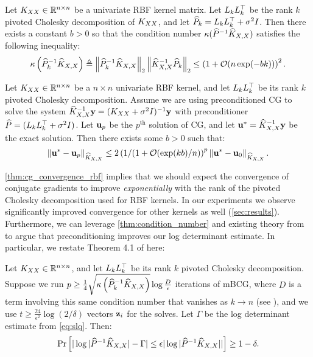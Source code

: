 \begin{lemma}
  \label{thm:condition_number}
  Let $K_{XX} \in \mathbb{R}^{n \times n}$ be a univariate RBF kernel matrix.
  Let $L_{k} L_k^\top$ be the rank $k$ pivoted Cholesky decomposition of $K_{XX}$, and let $\widehat{P}_{k} = L_k L_k^\top + \sigma^{2}I$.
  Then there exists a constant $b>0$ so that the condition number $\kappa(\widehat{P}^{-1}\widehat{K}_{X,X})$ satisfies the following inequality:
  \begin{equation}
    \kappa \left( \trainP_{k}^{-1}\trainK \right)
    \triangleq \left\Vert \trainP_{k}^{-1}\trainK \right\Vert_{2} \left\Vert \trainK^{-1}\trainP_{k} \right\Vert_{2}
    \leq \left( 1 + \bigo{n\exp(-bk)} \right)^2.
  \end{equation}
\end{lemma}
\begin{theorem}
  \label{thm:cg_convergence_rbf}
  Let $K_{XX} \in \mathbb{R}^{n \times n}$ be a $n \times n$ univariate RBF kernel, and let $L_k L_k^\top$ be its rank $k$ pivoted Cholesky decomposition.
  Assume we are using preconditioned CG to solve the system $\widehat{K}_{X,X}^{-1} \mathbf{y} = (K_{XX} + \sigma^2 I)^{-1} \mathbf{y}$ with preconditioner $\widehat{P} = (L_k L_k^\top + \sigma^2 I)$.
  Let $\mathbf{u}_p$ be the $p^\textrm{th}$ solution of CG, and let $\mathbf{u}^{*} = \widehat{K}_{X,X}^{-1} \mathbf{y}$ be the exact solution.
  Then there exists some $b > 0$ such that:
  \begin{equation}
    \Vert \bu^{*} - \bu_{p} \Vert_{\trainK}
    \leq 2 \left(1/(1 + \bigo{\exp(kb)/n}\right)^{p} \left\Vert \bu^{*} - \bu_{0} \right\Vert_{\trainK}.
  \end{equation}
\end{theorem}
%
\autoref{thm:cg_convergence_rbf} implies that we should expect the convergence of conjugate gradients to improve \emph{exponentially} with the rank of the pivoted Cholesky decomposition used for RBF kernels. In our experiments we observe significantly improved convergence for other kernels as well (\autoref{sec:results}). Furthermore, we can leverage \autoref{thm:condition_number} and existing theory from \cite{ubaru2017fast} to argue that preconditioning improves our log determinant estimate. In particular, we restate Theorem 4.1 of \citet{ubaru2017fast} here:
\begin{theorem}
  \label{thm:slq_convergence}
  Let $K_{XX} \in \mathbb{R}^{n \times n}$, and let $L_k L_k^\top$ be its rank $k$ pivoted Cholesky decomposition. Suppose we run $p \geq \frac{1}{4} \sqrt{ \kappa \left( \widehat{P}_{k}^{-1}\widehat{K}_{X,X} \right) } \log \frac{D}{\epsilon}$ iterations of mBCG, where $D$ is a term involving this same condition number that vanishes as $k \to n$ (see \cite{ubaru2017fast}), and we use $t \geq \frac{24}{\epsilon^{2}}\log(2/\delta)$ vectors $\mathbf{z}_{i}$ for the solves. Let $\Gamma$ be the log determinant estimate from \eqref{eq:slq}. Then:
  \begin{equation}
    \textrm{Pr}\left[\vert \log \vert \widehat{P}^{-1}\widehat{K}_{X,X} \vert - \Gamma \vert \leq \epsilon\vert \log \vert \widehat{P}^{-1}\widehat{K}_{X,X} \vert \vert \right] \geq 1 - \delta.
  \end{equation}
\end{theorem}
